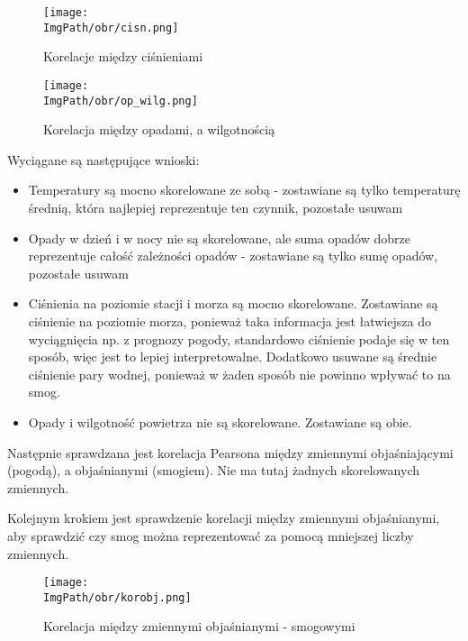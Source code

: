 \documentclass[a4paper,12pt,twoside,openany]{report}
\newcommand{\ImgPath}{.}
\begin{document}
\begin{figure}[H]
	\begin{center}
		\centering
		\texttt{[image: \\ImgPath/obr/cisn.png]}
	\end{center}
	\caption{Korelacje między ciśnieniami}
	\label{korcisn}
\end{figure}

\begin{figure}[H]
	\begin{center}
		\centering
		\texttt{[image: \\ImgPath/obr/op\_wilg.png]}
	\end{center}
	\caption{Korelacja między opadami, a wilgotnością}
	\label{koropwilg}
\end{figure}

Wyciągane są następujące wnioski:

\begin{itemize}
	\item Temperatury są mocno skorelowane ze sobą - zostawiane są tylko temperaturę średnią, która najlepiej reprezentuje ten czynnik, pozostałe usuwam
	\item Opady w dzień i w nocy nie są skorelowane, ale suma opadów dobrze reprezentuje całość zależności opadów - zostawiane są tylko sumę opadów, pozostałe usuwam
	\item Ciśnienia na poziomie stacji i morza są mocno skorelowane. Zostawiane są ciśnienie na poziomie morza, ponieważ taka informacja jest łatwiejsza do wyciągnięcia np. z prognozy pogody, standardowo ciśnienie podaje się w ten sposób, więc jest to lepiej interpretowalne. Dodatkowo usuwane są średnie ciśnienie pary wodnej, ponieważ w żaden sposób nie powinno wpływać to na smog.
	\item Opady i wilgotność powietrza nie są skorelowane. Zostawiane są obie.
\end{itemize}

Następnie sprawdzana jest korelacja Pearsona między zmiennymi objaśniającymi (pogodą), a objaśnianymi (smogiem). Nie ma tutaj żadnych skorelowanych zmiennych.

Kolejnym krokiem jest sprawdzenie korelacji między zmiennymi objaśnianymi, aby sprawdzić czy smog można reprezentować za pomocą mniejszej liczby zmiennych.

\begin{figure}[H]
	\begin{center}
		\centering
		\texttt{[image: \\ImgPath/obr/korobj.png]}
	\end{center}
	\caption{Korelacja między zmiennymi objaśnianymi - smogowymi}
	\label{korobj}
\end{figure}
\end{document}
